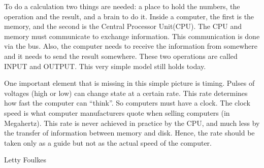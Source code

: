 \documentclass[blank]{impletter}
\begin{document}
To do a calculation two things are needed: a place to hold the
numbers, the operation and the result, and a brain to do it. Inside a
computer, the first is the memory, and the second is the Central
Processor Unit(CPU). The CPU and memory must communicate to exchange
information. This communication is done via the bus. Also, the
computer needs to receive the information from somewhere and it needs
to send the result somewhere. These two operations are called INPUT
and OUTPUT. This very simple model still holds today.

One important element that is missing in this simple picture is
timing. Pulses of voltages (high or low) can change state at a certain
rate. This rate determines how fast the computer can ``think''. So
computers must have a clock. The clock speed is what computer
manufacturers quote when selling computers (in Megahertz). This rate
is never achieved in practice by the CPU, and much less by the
transfer of information between memory and disk. Hence, the rate
should be taken only as a guide but not as the actual speed of the
computer.

{
Letty Foulkes
}
\end{document}
